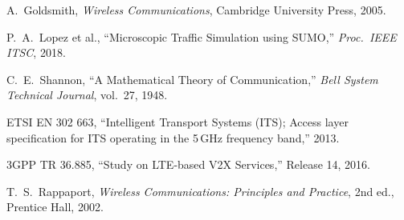 \documentclass[12pt, a4paper]{article}
\begin{document}
\begin{enumerate}[label={[\arabic*]}]
    \item A.\ Goldsmith, \textit{Wireless Communications}, Cambridge
    University Press, 2005.

    \item P.\ A.\ Lopez et al., ``Microscopic Traffic Simulation using SUMO,''
    \textit{Proc.\ IEEE ITSC}, 2018.

    \item C.\ E.\ Shannon, ``A Mathematical Theory of Communication,''
    \textit{Bell System Technical Journal}, vol.~27, 1948.

    \item ETSI EN 302 663, ``Intelligent Transport Systems (ITS); Access layer
    specification for ITS operating in the 5\,GHz frequency band,'' 2013.

    \item 3GPP TR 36.885, ``Study on LTE-based V2X Services,'' Release 14,
    2016.

    \item T.\ S.\ Rappaport, \textit{Wireless Communications: Principles and
    Practice}, 2nd ed., Prentice Hall, 2002.
\end{enumerate}
\end{document}
